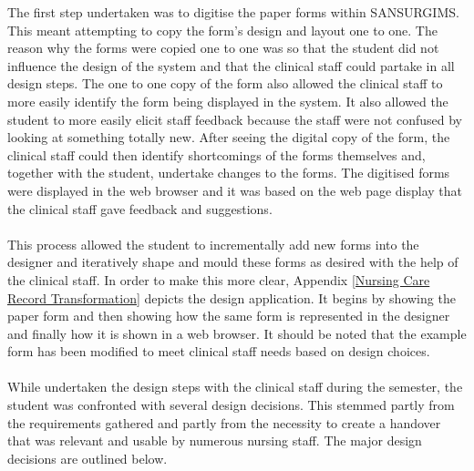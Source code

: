 \noindent The first step undertaken was to digitise the paper forms within SANSURGIMS. This meant attempting to copy the form's design and layout one to one. The reason why the forms were copied one to one was so that the student did not influence the design of the system and that the clinical staff could partake in all design steps. The one to one copy of the form also allowed the clinical staff to more easily identify the form being displayed in the system. It also allowed the student to more easily elicit staff feedback because the staff were not confused by looking at something totally new. After seeing the digital copy of the form, the clinical staff could then identify shortcomings of the forms themselves and, together with the student, undertake changes to the forms. The digitised forms were displayed in the web browser and it was based on the web page display that the clinical staff gave feedback and suggestions. 
\\ \\
This process allowed the student to incrementally add new forms into the designer and iteratively shape and mould these forms as desired with the help of the clinical staff. In order to make this more clear, Appendix \ref{Nursing Care Record Transformation} depicts the design application. It begins by showing the paper form and then showing how the same form is represented in the designer and finally how it is shown in a web browser. It should be noted that the example form has been modified to meet clinical staff needs based on design choices.
\\ \\ 
While undertaken the design steps with the clinical staff during the semester, the student was confronted with several design decisions. This stemmed partly from the requirements gathered and partly from the necessity to create a handover that was relevant and usable by numerous nursing staff. The major design decisions are outlined below.

